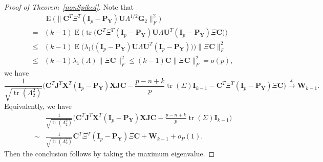 \documentclass[12pt]{article} %
\DeclareMathOperator{\mytr}{tr}
\DeclareMathOperator{\myE}{E}
\newcommand{\bX}{\mathbf{X}}
\newcommand{\bP}{\mathbf{P}}
\newcommand{\bY}{\mathbf{Y}}
\newcommand{\bG}{\mathbf{G}}
\newcommand{\bJ}{\mathbf{J}}
\newcommand{\bC}{\mathbf{C}}
\newcommand{\bI}{\mathbf{I}}
\newcommand{\bU}{\mathbf{U}}
\newcommand{\bW}{\mathbf{W}}
\theoremstyle{definition}
\begin{document}
\begin{proof}[\textrm{Proof of Theorem~\ref{nonSpiked}}]
    Note that
    $$
    \begin{aligned}
        &\myE\Big(\| \bC^T \Xi^T (\bI_p-\bP_{\bY})\bU\Lambda^{1/2}\bG_2\|_F^2\Big)\\
        = &
        (k-1)\myE \Big(\mytr\big(
        \bC^T \Xi^T (\bI_p-\bP_{\bY})\bU\Lambda \bU^T (\bI_p-\bP_{\bY})\Xi \bC
        \big)\Big)\\
        \leq &
        (k-1)\myE \Big(\lambda_1\big(
         (\bI_p-\bP_{\bY})\bU\Lambda \bU^T (\bI_p-\bP_{\bY})
        \big)\Big)
        \|\Xi \bC\|_F^2\\
        \leq &
        (k-1)\lambda_1(\Lambda)\|\Xi \bC\|_F^2
        \leq 
        (k-1)\bC \|\Xi \bC\|_F^2=o(p),
    \end{aligned}
    $$
    we have
    $$
    \frac{1}{\sqrt{\mytr(\Lambda_2^2)}}
    {\Big(\bC^T\bJ^T \bX^T(\bI_p-\bP_{\bY}) \bX \bJ\bC- \frac{p-n+k}{p}\mytr(\Sigma)\bI_{k-1}-\bC^T \Xi^T (\bI_p-\bP_{\bY})\Xi \bC}\Big)
    \xrightarrow{\mathcal{L}}\bW_{k-1}.
    $$
    Equivalently, we have
    $$
    \begin{aligned}
        &
    \frac{1}{\sqrt{\mytr(\Lambda_2^2)}}
        {\Big(\bC^T \bJ^T \bX^T(\bI_p-\bP_{\bY}) \bX \bJ\bC- \frac{p-n+k}{p}\mytr(\Sigma)\bI_{k-1}}\Big)\\
        \sim&
    \frac{1}{\sqrt{\mytr(\Lambda_2^2)}}
         \bC^T \Xi^T (\bI_p-\bP_{\bY})\Xi \bC
        +\bW_{k-1}+o_P(1).
    \end{aligned}
    $$
    Then the conclusion follows by taking the maximum eigenvalue.
\end{proof}
\end{document}
